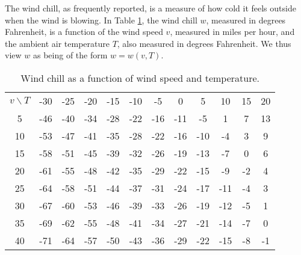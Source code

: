 \begin{activity} \label{A:10.2.12} The wind chill, as frequently
  reported, is a measure of how cold it feels outside when
  the wind is blowing.  In Table \ref{T:10.2.wind.chill}, the wind
  chill $w$, measured in degrees Fahrenheit, is a function of the wind speed $v$, measured in miles per hour, and
  the ambient air temperature $T$, also measured in degrees
  Fahrenheit.  We thus view $w$ as being of the form $w = w(v, T)$.

\begin{table}[ht] 
  \begin{center}
    \begin{tabular}{|c||c|c|c|c|c|c|c|c|c|c|c|}
      \hline
      $v \backslash T$  
         &-30  &-25 &-20 &-15 &-10 &-5  &0   &5   &10  &15  &20  \\
      \hhline{|=|=|=|=|=|=|=|=|=|=|=|=|}
      5  &-46	&-40 &-34 &-28 &-22 &-16 &-11 &-5 &1 &7 &13  \\
      \hline
      10 &-53	&-47 &-41 &-35 &-28 &-22 &-16 &-10 &-4 &3 &9   \\
      \hline
      15 &-58	&-51 &-45 &-39 &-32 &-26 &-19 &-13 &-7 &0 &6  \\
      \hline
      20 &-61	&-55 &-48 &-42 &-35 &-29 &-22 &-15 &-9 &-2 &4  \\
      \hline
      25 &-64	&-58 &-51 &-44 &-37 &-31 &-24 &-17 &-11 &-4 &3 \\
      \hline
      30 &-67	&-60 &-53 &-46 &-39 &-33 &-26 &-19 &-12 &-5 &1 \\
      \hline
      35 &-69	&-62 &-55 &-48 &-41 &-34 &-27 &-21 &-14 &-7 &0 \\
      \hline
      40 &-71	&-64 &-57 &-50 &-43 &-36 &-29 &-22 &-15 &-8 &-1 \\
      \hline
    \end{tabular}
    \caption{Wind chill as a function of wind speed and temperature.}
    \label{T:10.2.wind.chill}
  \end{center}
\end{table}

\end{activity}
